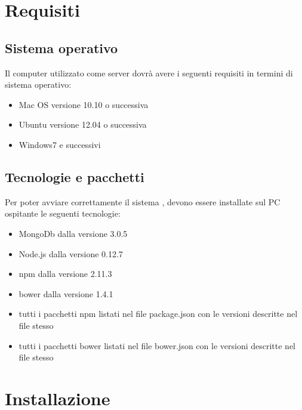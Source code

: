 \section{Requisiti}  %
\subsection{Sistema operativo}
Il  computer utilizzato come server dovr\`{a} avere i seguenti requisiti in termini di sistema operativo:
\begin{itemize}
\item  Mac OS versione 10.10 o successiva
\item Ubuntu versione 12.04 o successiva
\item Windows7 e successivi
\end{itemize}

\subsection{Tecnologie e pacchetti}
Per poter avviare correttamente il sistema \premi, devono essere installate sul PC ospitante le seguenti tecnologie:
\begin{itemize}
\item  MongoDb dalla versione 3.0.5
\item  Node.js dalla versione 0.12.7
\item  npm dalla versione 2.11.3
\item  bower dalla versione 1.4.1
\item tutti i pacchetti npm listati nel file package.json con le versioni descritte nel file stesso
\item tutti i pacchetti bower listati nel file bower.json con le versioni descritte nel file stesso
\end{itemize}

\newpage
\section{Installazione} %

